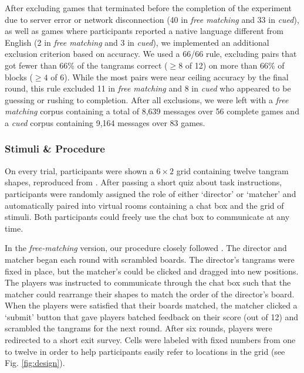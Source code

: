 After excluding games that terminated before the completion of the experiment due to server error or network disconnection (40 in \emph{free matching} and 33 in \emph{cued}), as well as games where participants reported a native language different from English (2 in \emph{free matching} and 3 in \emph{cued}), we implemented an additional exclusion criterion based on accuracy. 
We used a 66/66 rule, excluding pairs that got fewer than 66\% of the tangrams correct ($\ge8$ of 12) on more than 66\% of blocks ($\ge4$ of 6). 
While the most pairs were near ceiling accuracy by the final round, this rule excluded 11 in \emph{free matching} and 8 in \emph{cued} who appeared to be guessing or rushing to completion. 
After all exclusions, we were left with a \emph{free matching} corpus containing a total of 8,639 messages over 56 complete games and a \emph{cued} corpus containing 9,164 messages over 83 games.

\subsubsection{Stimuli \& Procedure}\label{stimuli}

On every trial, participants were shown a \(6 \times 2\) grid containing twelve tangram shapes, reproduced from \cite{ClarkWilkesGibbs86_ReferringCollaborative}.  
After passing a short quiz about task instructions, participants were randomly assigned the role of either `director' or `matcher' and automatically paired into virtual rooms containing a chat box and the grid of stimuli. 
Both participants could freely use the chat box to communicate at any time. 

In the \emph{free-matching} version, our procedure closely followed \cite{ClarkWilkesGibbs86_ReferringCollaborative}. 
The director and matcher began each round with scrambled boards. 
The director's tangrams were fixed in place, but the matcher's could be clicked and dragged into new positions.
The players was instructed to communicate through the chat box such that the matcher could rearrange their shapes to match the order of the director's board.
When the players were satisfied that their boards matched, the matcher clicked a `submit' button that gave players batched feedback on their score (out of 12) and scrambled the tangrams for the next round. 
After six rounds, players were redirected to a short exit survey. 
Cells were labeled with fixed numbers from one to twelve in order to help participants easily refer to locations in the grid (see Fig. \ref{fig:design}).

